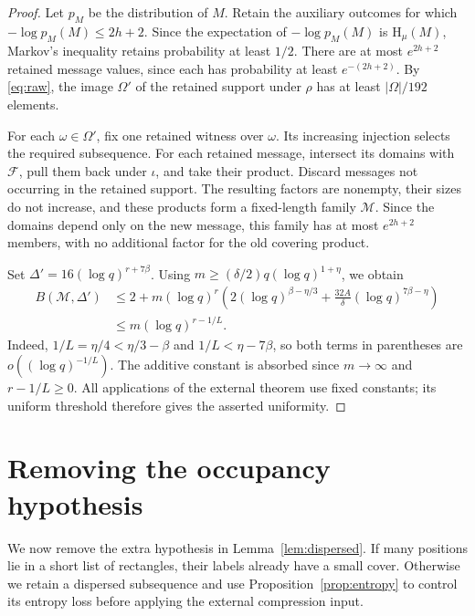 \documentclass[11pt,a4paper]{article}
\numberwithin{equation}{section}
\newcommand{\HH}{\mathrm H}
\begin{document}
\begin{proof}
Let $p_M$ be the distribution of $M$.
Retain the auxiliary outcomes for which
$-\log p_M(M)\le2h+2$.
Since the expectation of $-\log p_M(M)$ is $\HH_\mu(M)$,
Markov's inequality retains probability at least $1/2$.
There are at most $e^{2h+2}$ retained message values, since each
has probability at least $e^{-(2h+2)}$.
By \eqref{eq:raw}, the image $\Omega'$ of the retained support
under $\rho$ has at least $|\Omega|/192$ elements.

For each $\omega\in\Omega'$, fix one retained witness over
$\omega$. Its increasing injection selects the required
subsequence. For each retained message, intersect its domains
with $\mathcal F$, pull them back under $\iota$, and take their
product. Discard messages not occurring in the retained support.
The resulting factors are nonempty, their sizes do not increase,
and these products form a fixed-length family $\mathcal M$.
Since the domains depend only on the new message, this family
has at most $e^{2h+2}$ members, with no additional factor for the
old covering product.

Set $\Delta'=16(\log q)^{r+7\beta}$.
Using $m\ge(\delta/2)q(\log q)^{1+\eta}$, we obtain
\begin{align*}
 B(\mathcal M,\Delta')
 &\le2+m(\log q)^r\left(
       2(\log q)^{\beta-\eta/3}
       +\frac{32A}{\delta}(\log q)^{7\beta-\eta}\right)\\
 &\le m(\log q)^{r-1/L}.
\end{align*}
Indeed, $1/L=\eta/4<\eta/3-\beta$ and
$1/L<\eta-7\beta$, so both terms in parentheses are
$o((\log q)^{-1/L})$.
The additive constant is absorbed since $m\to\infty$ and
$r-1/L\ge0$.
All applications of the external theorem use fixed constants;
its uniform threshold therefore gives the asserted uniformity.
\end{proof}

\section{Removing the occupancy hypothesis}\label{sec:reduction}

We now remove the extra hypothesis in Lemma~\ref{lem:dispersed}.
If many positions lie in a short list of rectangles, their labels
already have a small cover. Otherwise we retain a dispersed
subsequence and use Proposition~\ref{prop:entropy} to control its
entropy loss before applying the external compression input.
\end{document}
